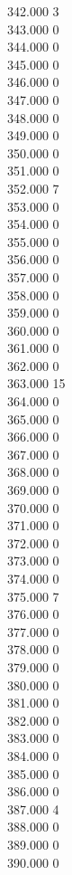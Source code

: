 { 342.000	3 \\
 343.000	0 \\
 344.000	0 \\
 345.000	0 \\
 346.000	0 \\
 347.000	0 \\
 348.000	0 \\
 349.000	0 \\
 350.000	0 \\
 351.000	0 \\
 352.000	7 \\
 353.000	0 \\
 354.000	0 \\
 355.000	0 \\
 356.000	0 \\
 357.000	0 \\
 358.000	0 \\
 359.000	0 \\
 360.000	0 \\
 361.000	0 \\
 362.000	0 \\
 363.000	15 \\
 364.000	0 \\
 365.000	0 \\
 366.000	0 \\
 367.000	0 \\
 368.000	0 \\
 369.000	0 \\
 370.000	0 \\
 371.000	0 \\
 372.000	0 \\
 373.000	0 \\
 374.000	0 \\
 375.000	7 \\
 376.000	0 \\
 377.000	0 \\
 378.000	0 \\
 379.000	0 \\
 380.000	0 \\
 381.000	0 \\
 382.000	0 \\
 383.000	0 \\
 384.000	0 \\
 385.000	0 \\
 386.000	0 \\
 387.000	4 \\
 388.000	0 \\
 389.000	0 \\
 390.000	0 \\
}

